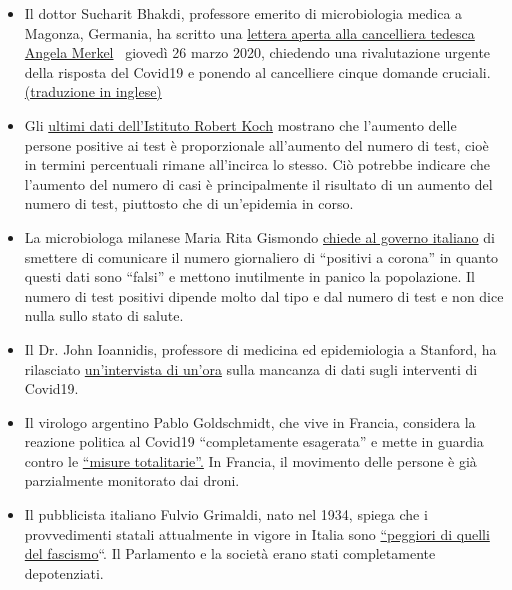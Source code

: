 \begin{itemize}
\tightlist
\item
  Il dottor Sucharit Bhakdi, professore emerito di microbiologia medica
  a Magonza, Germania, ha scritto una
  \href{https://swprs.org/offener-brief-von-professor-sucharit-bhakdi-an-bundeskanzlerin-dr-angela-merkel/}{lettera
  aperta alla cancelliera tedesca Angela Merkel} ~giovedì 26 marzo 2020,
  chiedendo una rivalutazione urgente della risposta del Covid19 e
  ponendo al cancelliere cinque domande cruciali.
  \href{https://swprs.org/open-letter-from-professor-sucharit-bhakdi-to-german-chancellor-dr-angela-merkel/}{(traduzione
  in inglese)}
\item
  Gli
  \href{https://multipolar-magazin.de/artikel/coronavirus-irrefuhrung-fallzahlen}{ultimi
  dati dell'Istituto Robert Koch} mostrano che l'aumento delle persone
  positive ai test è proporzionale all'aumento del numero di test, cioè
  in termini percentuali rimane all'incirca lo stesso. Ciò potrebbe
  indicare che l'aumento del numero di casi è principalmente il
  risultato di un aumento del numero di test, piuttosto che di
  un'epidemia in corso.
\item
  La microbiologa milanese Maria Rita Gismondo
  \href{https://www.secoloditalia.it/2020/03/coronavirus-la-gismondo-ammonisce-duramente-basta-snocciolare-numeri-sui-positivi-sono-dati-falsati/}{chiede
  al governo italiano} di smettere di comunicare il numero giornaliero
  di ``positivi a corona'' in quanto questi dati sono ``falsi'' e
  mettono inutilmente in panico la popolazione. Il numero di test
  positivi dipende molto dal tipo e dal numero di test e non dice nulla
  sullo stato di salute.
\item
  Il Dr. John Ioannidis, professore di medicina ed epidemiologia a
  Stanford, ha rilasciato
  \href{https://www.youtube.com/watch?v=d6MZy-2fcBw}{un'intervista di
  un'ora} sulla mancanza di dati sugli interventi di Covid19.
\item
  Il virologo argentino Pablo Goldschmidt, che vive in Francia,
  considera la reazione politica al Covid19 ``completamente esagerata''
  e mette in guardia contro le
  \href{https://www.infobae.com/coronavirus/2020/03/28/para-un-prestigioso-cientifico-argentino-el-coronavirus-no-merece-que-el-planeta-este-en-un-estado-de-parate-total/}{``misure
  totalitarie''.} In Francia, il movimento delle persone è già
  parzialmente monitorato dai droni. 
\item
  Il pubblicista italiano Fulvio Grimaldi, nato nel 1934, spiega che i
  provvedimenti statali attualmente in vigore in Italia sono
  \href{https://www.youtube.com/watch?v=O3BuNp01vpc}{``peggiori di
  quelli del fascismo}``. Il Parlamento e la società erano stati
  completamente depotenziati.
\end{itemize}

